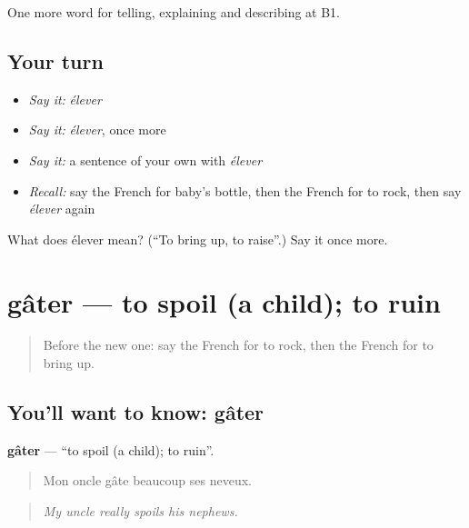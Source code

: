\begin{grammarlens}[title={What you've built}]
One more word for telling, explaining and describing at B1.
\end{grammarlens}

\subsection*{Your turn}
\begin{itemize}
\raggedright
  \item \emph{Say it:} \emph{élever}
  \item \emph{Say it:} \emph{élever}, once more
  \item \emph{Say it:} a sentence of your own with \emph{élever}
  \item \emph{Recall:} say the French for baby's bottle, then the French for to rock, then say \emph{élever} again
\end{itemize}

\begin{tcolorbox}[breakable,colback=teal!4,colframe=teal!35!black,title={Before you move on}]
What does élever mean? (\textquotedblleft{}To bring up, to raise\textquotedblright{}.) Say it once more.
\end{tcolorbox}
\section[gâter]{gâter — to spoil (a child); to ruin}

\label{lesson:FR-C494-gater}



\begin{quote}
Before the new one: say the French for to rock, then the French for to bring up.
\end{quote}

\subsection*{You'll want to know: gâter}
\textbf{gâter} — \textquotedblleft{}to spoil (a child); to ruin\textquotedblright{}.

\begin{quote}
Mon oncle gâte beaucoup ses neveux.
\end{quote}

\begin{quote}
\emph{My uncle really spoils his nephews.}
\end{quote}

